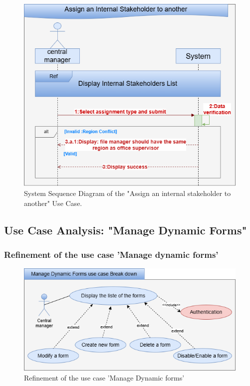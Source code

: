 \clearpage
\begin{figure}[h!]
    \centering
    \includegraphics[width=1\textwidth]{figures/seqassign internal stakeholders.png}
    \caption{System Sequence Diagram of the "Assign an internal stakeholder to another" Use Case.}
\end{figure}
\clearpage

\subsection{Use Case Analysis: "Manage Dynamic Forms"}
\subsubsection{Refinement of the use case 'Manage dynamic forms'}
\begin{figure}[h!]
    \centering
    \includegraphics[width=1\textwidth]{figures/bdmanages dynamic forms-Break down.png}
    \caption{Refinement of the use case 'Manage Dynamic forms'}
\end{figure}\

